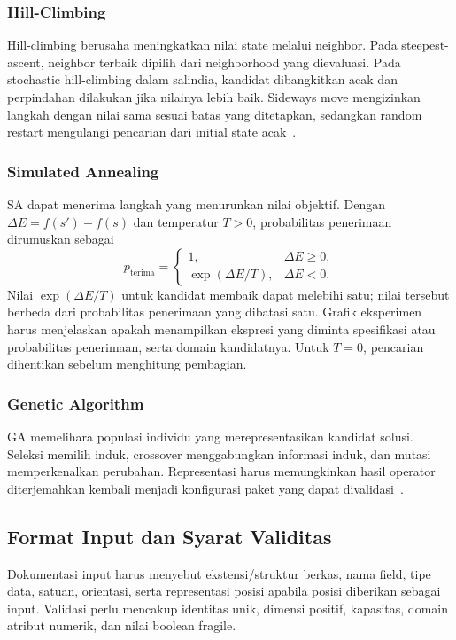 \subsubsection{Hill-Climbing}
Hill-climbing berusaha meningkatkan nilai state melalui neighbor. Pada
steepest-ascent, neighbor terbaik dipilih dari neighborhood yang dievaluasi.
Pada stochastic hill-climbing dalam salindia, kandidat dibangkitkan acak dan
perpindahan dilakukan jika nilainya lebih baik. Sideways move mengizinkan
langkah dengan nilai sama sesuai batas yang ditetapkan, sedangkan random
restart mengulangi pencarian dari initial state acak~\cite{kuliah}.


\subsubsection{Simulated Annealing}
SA dapat menerima langkah yang menurunkan nilai objektif. Dengan
$\Delta E=f(s')-f(s)$ dan temperatur $T>0$, probabilitas penerimaan dirumuskan
sebagai~\cite{kuliah}
\begin{equation}
 p_{\mathrm{terima}}=
 \begin{cases}1,&\Delta E\geq0,\\
 \exp(\Delta E/T),&\Delta E<0.
 \end{cases}\label{eq:sa}
\end{equation}
Nilai $\exp(\Delta E/T)$ untuk kandidat membaik dapat melebihi satu; nilai
tersebut berbeda dari probabilitas penerimaan yang dibatasi satu. Grafik
eksperimen harus menjelaskan apakah menampilkan ekspresi yang diminta
spesifikasi atau probabilitas penerimaan, serta domain kandidatnya. Untuk
$T=0$, pencarian dihentikan sebelum menghitung pembagian.


\subsubsection{Genetic Algorithm}
GA memelihara populasi individu yang merepresentasikan kandidat solusi.
Seleksi memilih induk, crossover menggabungkan informasi induk, dan mutasi
memperkenalkan perubahan. Representasi harus memungkinkan hasil operator
diterjemahkan kembali menjadi konfigurasi paket yang dapat divalidasi~\cite{kuliah}.


\subsection{Format Input dan Syarat Validitas}
Dokumentasi input harus menyebut ekstensi/struktur berkas, nama field, tipe
data, satuan, orientasi, serta representasi posisi apabila posisi diberikan
sebagai input. Validasi perlu mencakup identitas unik, dimensi positif,
kapasitas, domain atribut numerik, dan nilai boolean fragile.
